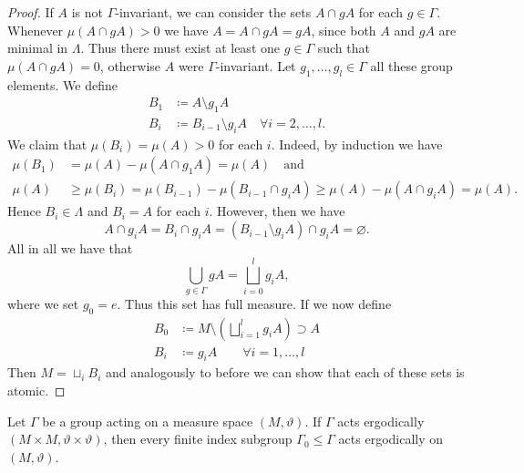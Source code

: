 \begin{proof}
  If \(A\) is not \(\Gamma\)-invariant, we can consider the sets \(A \cap gA\) for each \(g \in \Gamma\). Whenever \(\mu(A \cap gA) > 0\) we have \(A = A \cap gA = gA\), since both \(A\) and \(gA\) are minimal in \(\Lambda\). Thus there must exist at least one \(g \in \Gamma\) such that \(\mu(A \cap gA) = 0\), otherwise \(A\) were \(\Gamma\)-invariant. Let \(g_1, \dots, g_l \in \Gamma\) all these group elements. We define
  \begin{align*}
    B_1 & \coloneqq A \setminus g_1A\\
    B_i & \coloneqq B_{i-1} \setminus g_i A \quad \forall i = 2, \dots, l.
  \end{align*}
  We claim that \(\mu(B_i) = \mu(A) >0\) for each \(i\). Indeed, by induction we have
  \begin{align*}
    \mu(B_1) & = \mu(A) - \mu(A \cap g_1A) = \mu(A) \quad \text{and}\\
    \mu(A) & \geq \mu(B_i) = \mu(B_{i-1}) - \mu(B_{i-1} \cap g_iA) \geq \mu(A) - \mu(A \cap g_i A) = \mu(A).
  \end{align*}
  Hence \(B_i \in \Lambda\) and \(B_i = A\) for each \(i\). However, then we have
  \[
    A \cap g_iA = B_i \cap g_iA = (B_{i-1} \setminus g_iA) \cap g_iA = \varnothing.
  \]
  All in all we have that
  \[
    \bigcup_{g \in \Gamma} gA = \bigsqcup_{i=0}^l g_i A,
  \]
  where we set \(g_0 = e\). Thus this set has full measure. If we now define
  \begin{align*}
    B_0 & \coloneqq M \setminus \left (\bigsqcup_{i=1}^l g_iA \right) \supset A\\
    B_i & \coloneqq g_iA \qquad \forall i = 1, \dots, l
  \end{align*}
  Then \(M = \sqcup_i B_i\) and analogously to before we can show that each of these sets is atomic.
\end{proof}

\begin{lemma}[{\cite[Lem 4.3]{MR3509968}}]
  Let \(\Gamma\) be a group acting on a measure space \((M, \vartheta)\). If \(\Gamma\) acts ergodically \((M \times M, \vartheta \times \vartheta)\), then every  finite index subgroup \(\Gamma_0 \leq \Gamma\) acts ergodically on \((M, \vartheta)\).
\end{lemma}

